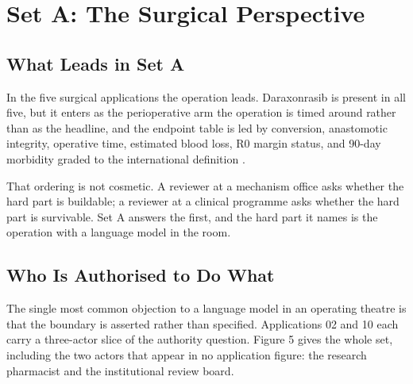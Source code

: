 \section{Set A: The Surgical Perspective}

\subsection{What Leads in Set A}

In the five surgical applications the operation leads. Daraxonrasib is present
in all five, but it enters as the perioperative arm the operation is timed
around rather than as the headline, and the endpoint table is led by conversion,
anastomotic integrity, operative time, estimated blood loss, R0 margin status,
and 90-day morbidity graded to the international definition
\cite{bassi2017isgps}.

That ordering is not cosmetic. A reviewer at a mechanism office asks whether the
hard part is buildable; a reviewer at a clinical programme asks whether the hard
part is survivable. Set A answers the first, and the hard part it names is the
operation with a language model in the room.

\subsection{Who Is Authorised to Do What}

The single most common objection to a language model in an operating theatre is
that the boundary is asserted rather than specified. Applications 02 and 10 each
carry a three-actor slice of the authority question. Figure 5 gives the whole
set, including the two actors that appear in no application figure: the research
pharmacist and the institutional review board.

